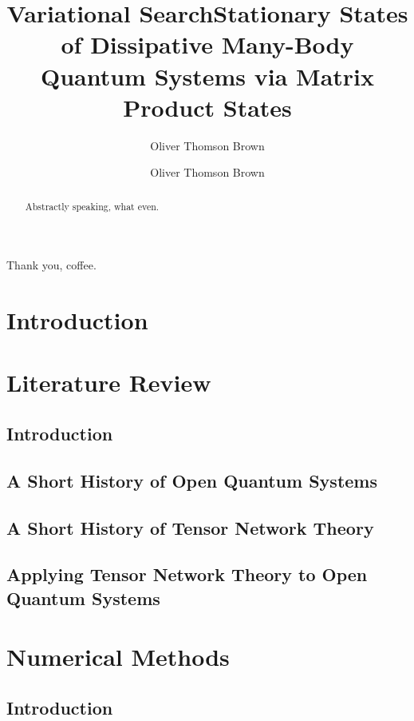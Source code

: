 \documentclass[a4paper,oneside,12pt]{hwthesis}
\author{Oliver Thomson Brown}
\title{Variational Search}
\author{Oliver Thomson Brown}
\title{Stationary States of Dissipative Many-Body Quantum Systems via Matrix Product States}
\begin{document}
\maketitle


\begin{acknowledgements}
Thank you, coffee.
\end{acknowledgements}

\begin{abstract}
Abstractly speaking, what even.
\end{abstract}

\tableofcontents

\chapter{Introduction}
\setcounter{page}{1}

\chapter{Literature Review}

\section{Introduction}

\section{A Short History of Open Quantum Systems}

\section{A Short History of Tensor Network Theory}

\section{Applying Tensor Network Theory to Open Quantum Systems}

\chapter{Numerical Methods}

\section{Introduction}
\end{document}

